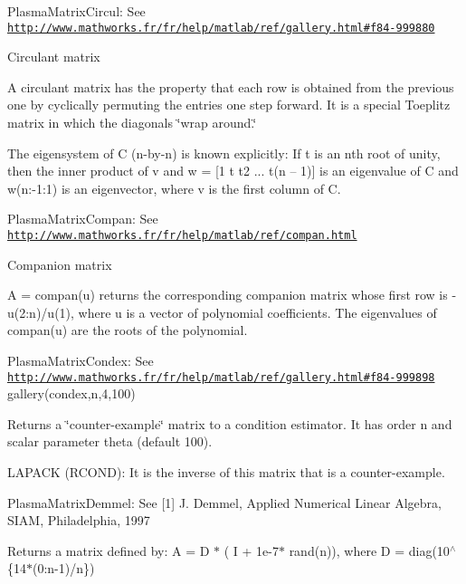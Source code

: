 \begin{DoxyItemize}
\item Plasma\+Matrix\+Circul\+: See \href{http://www.mathworks.fr/fr/help/matlab/ref/gallery.html#f84-999880}{\tt http\+://www.\+mathworks.\+fr/fr/help/matlab/ref/gallery.\+html\#f84-\/999880}\end{DoxyItemize}
Circulant matrix

A circulant matrix has the property that each row is obtained from the previous one by cyclically permuting the entries one step forward. It is a special Toeplitz matrix in which the diagonals \char`\"{}wrap around.\char`\"{}

The eigensystem of C (n-\/by-\/n) is known explicitly\+: If t is an nth root of unity, then the inner product of v and w = \mbox{[}1 t t2 ... t(n – 1)\mbox{]} is an eigenvalue of C and w(n\+:-\/1\+:1) is an eigenvector, where v is the first column of C.

\begin{DoxyItemize}
\item Plasma\+Matrix\+Compan\+: See \href{http://www.mathworks.fr/fr/help/matlab/ref/compan.html}{\tt http\+://www.\+mathworks.\+fr/fr/help/matlab/ref/compan.\+html}\end{DoxyItemize}
Companion matrix

A = compan(u) returns the corresponding companion matrix whose first row is -\/u(2\+:n)/u(1), where u is a vector of polynomial coefficients. The eigenvalues of compan(u) are the roots of the polynomial.

\begin{DoxyItemize}
\item Plasma\+Matrix\+Condex\+: See \href{http://www.mathworks.fr/fr/help/matlab/ref/gallery.html#f84-999898}{\tt http\+://www.\+mathworks.\+fr/fr/help/matlab/ref/gallery.\+html\#f84-\/999898} gallery(\textquotesingle{}condex\textquotesingle{},n,4,100)\end{DoxyItemize}
Returns a \char`\"{}counter-\/example\char`\"{} matrix to a condition estimator. It has order n and scalar parameter theta (default 100).

L\+A\+P\+A\+C\+K (R\+C\+O\+N\+D)\+: It is the inverse of this matrix that is a counter-\/example.

\begin{DoxyItemize}
\item Plasma\+Matrix\+Demmel\+: See \mbox{[}1\mbox{]} J. Demmel, Applied Numerical Linear Algebra, S\+I\+A\+M, Philadelphia, 1997\end{DoxyItemize}
Returns a matrix defined by\+: A = D $\ast$ ( I + 1e-\/7$\ast$ rand(n)), where D = diag(10$^\wedge$\{14$\ast$(0\+:n-\/1)/n\})


